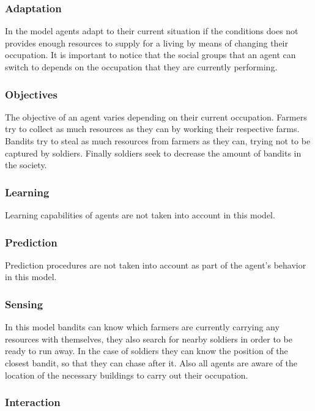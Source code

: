 \documentclass{wscpaperproc}
\begin{document}
\subsubsection{Adaptation}

In the model agents adapt to their current situation if the conditions does not
provides enough resources to supply for a living by means of changing their
occupation. It is important to notice that the social groups that an agent can
switch to depends on the occupation that they are currently performing.

\subsubsection{Objectives}

The objective of an agent varies depending on their current occupation. Farmers
try to collect as much resources as they can by working their respective farms.
Bandits try to steal as much resources from farmers as they can, trying not to
be captured by soldiers. Finally soldiers seek to decrease the amount of
bandits in the society.

\subsubsection{Learning}

Learning capabilities of agents are not taken into account in this model.

\subsubsection{Prediction}

Prediction procedures are not taken into account as part of the agent's
behavior in this model.

\subsubsection{Sensing}

In this model bandits can know which farmers are currently carrying any resources
with themselves, they also search for nearby soldiers in order to be ready to
run away. In the case of soldiers they can know the position of the closest
bandit, so that they can chase after it. Also all agents are aware of the
location of the necessary buildings to carry out their occupation.

\subsubsection{Interaction}
\end{document}
